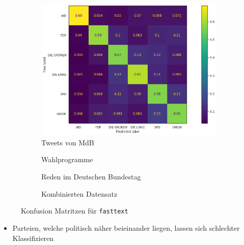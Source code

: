 \begin{figure}[H]
    \begin{subfigure}{.5\textwidth}
      \centering
      \includegraphics[width=0.9\linewidth]{data/images/fasttext_tweets_confusion.png}
      \caption{Tweets von \acs{MdB}} \label{sfig:confusionMatrixFastTextTweets}
    \end{subfigure}
    \begin{subfigure}{.5\textwidth}
      \centering
      \caption{Wahlprogramme} \label{sfig:confusionMatrixFastTextManifest}
    \end{subfigure}
    \begin{subfigure}{.5\textwidth}
      \centering
      \caption{Reden im Deutschen Bundestag} \label{sfig:confusionMatrixFastTextSpeeches}
    \end{subfigure}
    \begin{subfigure}{.5\textwidth}
      \centering
      \caption{Kombinierten Datensatz} \label{sfig:confusionMatrixFastTextAll}
    \end{subfigure}
    \caption{Konfusion Matritzen für \texttt{fasttext}} \label{fig:confusionMatrixFastText}
\end{figure}

\begin{itemize}
    \item Parteien, welche politisch näher beieinander liegen, lassen sich schlechter Klassifizieren
\end{itemize}


